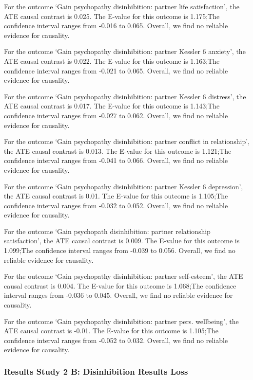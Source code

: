\documentclass[
  singlecolumn]{article}
\begin{document}
For the outcome `Gain psychopathy disinhibition: partner life
satisfaction', the ATE causal contrast is 0.025. The E-value for this
outcome is 1.175;The confidence interval ranges from -0.016 to 0.065.
Overall, we find no reliable evidence for causality.

For the outcome `Gain psychopathy disinhibition: partner Kessler 6
anxiety', the ATE causal contrast is 0.022. The E-value for this outcome
is 1.163;The confidence interval ranges from -0.021 to 0.065. Overall,
we find no reliable evidence for causality.

For the outcome `Gain psychopathy disinhibition: partner Kessler 6
distress', the ATE causal contrast is 0.017. The E-value for this
outcome is 1.143;The confidence interval ranges from -0.027 to 0.062.
Overall, we find no reliable evidence for causality.

For the outcome `Gain psychopathy disinhibition: partner conflict in
relationship', the ATE causal contrast is 0.013. The E-value for this
outcome is 1.121;The confidence interval ranges from -0.041 to 0.066.
Overall, we find no reliable evidence for causality.

For the outcome `Gain psychopathy disinhibition: partner Kessler 6
depression', the ATE causal contrast is 0.01. The E-value for this
outcome is 1.105;The confidence interval ranges from -0.032 to 0.052.
Overall, we find no reliable evidence for causality.

For the outcome `Gain psychopath disinhibition: partner relationship
satisfaction', the ATE causal contrast is 0.009. The E-value for this
outcome is 1.099;The confidence interval ranges from -0.039 to 0.056.
Overall, we find no reliable evidence for causality.

For the outcome `Gain psychopathy disinhibition: partner self-esteem',
the ATE causal contrast is 0.004. The E-value for this outcome is
1.068;The confidence interval ranges from -0.036 to 0.045. Overall, we
find no reliable evidence for causality.

For the outcome `Gain psychopathy disinhibition: partner pers.
wellbeing', the ATE causal contrast is -0.01. The E-value for this
outcome is 1.105;The confidence interval ranges from -0.052 to 0.032.
Overall, we find no reliable evidence for causality.

\subsubsection{Results Study 2 B: Disinhibition Results
Loss}\label{results-study-2-b-disinhibition-results-loss}
\end{document}
